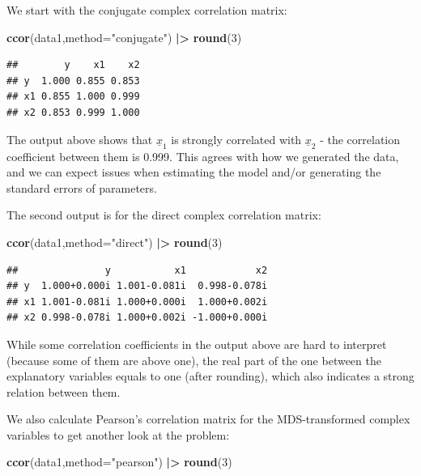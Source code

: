 \documentclass[
]{book}
\newenvironment{Shaded}{\begin{snugshade}}{\end{snugshade}}
\newcommand{\DataTypeTok}[1]{\textcolor[rgb]{0.13,0.29,0.53}{#1}}
\newcommand{\DecValTok}[1]{\textcolor[rgb]{0.00,0.00,0.81}{#1}}
\newcommand{\ErrorTok}[1]{\textcolor[rgb]{0.64,0.00,0.00}{\textbf{#1}}}
\newcommand{\KeywordTok}[1]{\textcolor[rgb]{0.13,0.29,0.53}{\textbf{#1}}}
\newcommand{\NormalTok}[1]{#1}
\newcommand{\OperatorTok}[1]{\textcolor[rgb]{0.81,0.36,0.00}{\textbf{#1}}}
\newcommand{\StringTok}[1]{\textcolor[rgb]{0.31,0.60,0.02}{#1}}
\begin{document}
We start with the conjugate complex correlation matrix:

\begin{Shaded}
\begin{Highlighting}[]
\KeywordTok{ccor}\NormalTok{(data1,}\DataTypeTok{method=}\StringTok{"conjugate"}\NormalTok{) }\OperatorTok{|}\ErrorTok{\textgreater{}}\StringTok{ }\KeywordTok{round}\NormalTok{(}\DecValTok{3}\NormalTok{)}
\end{Highlighting}
\end{Shaded}

\begin{verbatim}
##        y    x1    x2
## y  1.000 0.855 0.853
## x1 0.855 1.000 0.999
## x2 0.853 0.999 1.000
\end{verbatim}

The output above shows that \(\underline{x}_{1}\) is strongly correlated with \(\underline{x}_{2}\) - the correlation coefficient between them is 0.999. This agrees with how we generated the data, and we can expect issues when estimating the model and/or generating the standard errors of parameters.

The second output is for the direct complex correlation matrix:

\begin{Shaded}
\begin{Highlighting}[]
\KeywordTok{ccor}\NormalTok{(data1,}\DataTypeTok{method=}\StringTok{"direct"}\NormalTok{) }\OperatorTok{|}\ErrorTok{\textgreater{}}\StringTok{ }\KeywordTok{round}\NormalTok{(}\DecValTok{3}\NormalTok{)}
\end{Highlighting}
\end{Shaded}

\begin{verbatim}
##               y           x1            x2
## y  1.000+0.000i 1.001-0.081i  0.998-0.078i
## x1 1.001-0.081i 1.000+0.000i  1.000+0.002i
## x2 0.998-0.078i 1.000+0.002i -1.000+0.000i
\end{verbatim}

While some correlation coefficients in the output above are hard to interpret (because some of them are above one), the real part of the one between the explanatory variables equals to one (after rounding), which also indicates a strong relation between them.

We also calculate Pearson's correlation matrix for the MDS-transformed complex variables to get another look at the problem:

\begin{Shaded}
\begin{Highlighting}[]
\KeywordTok{ccor}\NormalTok{(data1,}\DataTypeTok{method=}\StringTok{"pearson"}\NormalTok{) }\OperatorTok{|}\ErrorTok{\textgreater{}}\StringTok{ }\KeywordTok{round}\NormalTok{(}\DecValTok{3}\NormalTok{)}
\end{Highlighting}
\end{Shaded}
\end{document}
